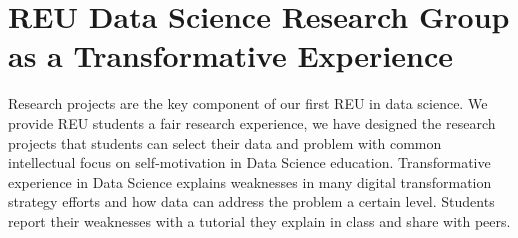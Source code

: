 \documentclass[10pt, a4paper, twocolumn]{article} %
\begin{document}




\section{REU Data Science Research Group as a Transformative Experience}


Research projects are the key component of our first REU in data science. We provide REU students a fair research experience, we have designed the research projects that students can select their data and problem with common intellectual focus on self-motivation in Data Science education. Transformative experience in Data Science explains weaknesses in many digital transformation strategy efforts and how data can address the problem a certain level. Students report their weaknesses with a tutorial they explain in class and share with peers. 




\printbibliography[title={Bibliography}] %

\end{document}
